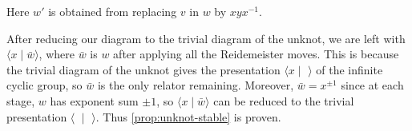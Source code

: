Here $w'$ is obtained from replacing $v$ in $w$ by $xyx^{-1}$.


After reducing our diagram to the trivial diagram of the unknot, we are left with $\langle x \mid \bar w\rangle$, where $\bar w$ is $w$ after applying all the Reidemeister moves. This is because the trivial diagram of the unknot gives the presentation $\langle x\mid \,\,\rangle$ of the infinite cyclic group, so $\bar w$ is the only relator remaining.  Moreover, $\bar w = x^{\pm1}$ since at each stage, $w$ has exponent sum $\pm 1$, so $\langle x \mid \bar w\rangle$ can be reduced to the trivial presentation $\langle \,\, \mid \,\, \rangle$. Thus \autoref{prop:unknot-stable} is proven.

